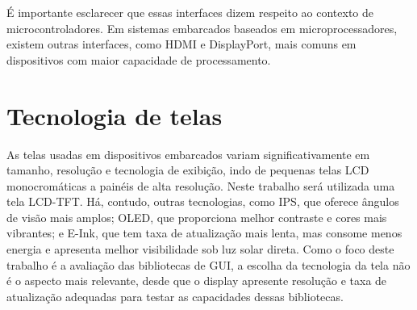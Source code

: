 É importante esclarecer que essas interfaces dizem respeito ao contexto de microcontroladores. Em sistemas embarcados baseados em microprocessadores, existem outras interfaces, como HDMI e DisplayPort, mais comuns em dispositivos com maior capacidade de processamento.

\section{Tecnologia de telas}

As telas usadas em dispositivos embarcados variam significativamente em tamanho, resolução e tecnologia de exibição, indo de pequenas telas LCD monocromáticas a painéis de alta resolução. Neste trabalho será utilizada uma tela LCD-TFT. Há, contudo, outras tecnologias, como IPS, que oferece ângulos de visão mais amplos; OLED, que proporciona melhor contraste e cores mais vibrantes; e E-Ink, que tem taxa de atualização mais lenta, mas consome menos energia e apresenta melhor visibilidade sob luz solar direta. Como o foco deste trabalho é a avaliação das bibliotecas de GUI, a escolha da tecnologia da tela não é o aspecto mais relevante, desde que o display apresente resolução e taxa de atualização adequadas para testar as capacidades dessas bibliotecas.
